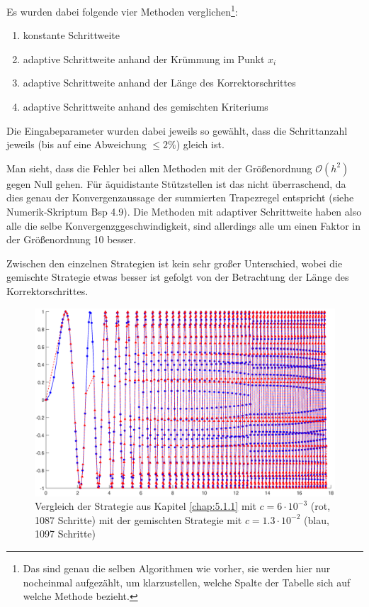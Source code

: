 \documentclass[a4paper,11pt,bibliography=totoc,listof=totoc,headinclude=true,cleardoublepage=empty,oneside]{scrartcl}
\begin{document}
Es wurden dabei folgende vier Methoden verglichen\footnote{Das sind genau die selben Algorithmen wie vorher, sie werden hier nur nocheinmal aufgezählt, um klarzustellen, welche Spalte der Tabelle sich auf welche Methode bezieht.}:
\begin{enumerate}
	\item konstante Schrittweite
	\item adaptive Schrittweite anhand der Krümmung im Punkt $x_i$
	\item adaptive Schrittweite anhand der Länge des Korrektorschrittes
	\item adaptive Schrittweite anhand des gemischten Kriteriums
\end{enumerate}
Die Eingabeparameter wurden dabei jeweils so gewählt, dass die Schrittanzahl jeweils (bis auf eine Abweichung $\le 2\%$) gleich ist.

Man sieht, dass die Fehler bei allen Methoden mit der Größenordnung $\mathcal{O}(h^2)$ gegen Null gehen. Für äquidistante Stützstellen ist das nicht überraschend, da dies genau der Konvergenzaussage der summierten Trapezregel entspricht (siehe Numerik-Skriptum Bsp 4.9). Die Methoden mit adaptiver Schrittweite haben also alle die selbe Konvergenzggeschwindigkeit, sind allerdings alle um einen Faktor in der Größenordnung 10 besser.

Zwischen den einzelnen Strategien ist kein sehr großer Unterschied, wobei die gemischte Strategie etwas besser ist gefolgt von der Betrachtung der Länge des Korrektorschrittes. 

\begin{figure}[ht]
	\centering
	\includegraphics[trim = 41mm 0mm 30mm 0mm, clip, width=\linewidth]{plots/adapt/br}
	\caption{Vergleich der Strategie aus Kapitel \ref{chap:5.1.1} mit $c=6 \cdot10^{-3}$ (rot, 1087 Schritte) mit der gemischten Strategie mit $c=1.3 \cdot10^{-2}$ (blau, 1097 Schritte) }
	\label{fig:br}
	
\end{figure}
\end{document}
